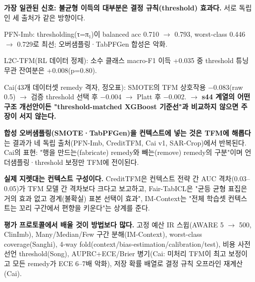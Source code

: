 \par\noindent \textbullet\enspace \textbf{가장 일관된 신호: 불균형 이득의 대부분은 결정 규칙(threshold) 효과다.} 서로 독립인 세 출처가 같은 방향이다.

\par\noindent \textbullet\enspace PFN-Imb: thresholding(τ=\allowbreak{}π₁)이 balanced acc 0.710 \ensuremath{\rightarrow} 0.793, worst-class 0.446 \ensuremath{\rightarrow} 0.729로 최선; 오버샘플링·TabPFGen 합성은 악화.


\par\noindent \textbullet\enspace L2C-TFM(RL 데이터 정제): 소수 클래스 macro-F1 이득 +\allowbreak{}0.035 중 threshold 튜닝 무관 잔여분은 +\allowbreak{}0.008(p=\allowbreak{}0.80).


\par\noindent \textbullet\enspace Cai(43개 데이터셋 remedy 격자, 정오표): SMOTE의 TFM 상호작용 −0.083(raw 0.5)  \ensuremath{\rightarrow}  검증 threshold 선택 후 −0.004  \ensuremath{\rightarrow}  Platt 후 −0.002.  \ensuremath{\rightarrow}  \textbf{s44 계열의 어떤 구조 개선안이든 "threshold-matched XGBoost 기준선"과 비교하지 않으면 주장이 서지 않는다.}



\par\noindent \textbullet\enspace \textbf{합성 오버샘플링(SMOTE·TabPFGen)을 컨텍스트에 넣는 것은 TFM에 해롭다}는 결과가 네 독립 출처(PFN-Imb, CreditTFM, Cai v1, SAR-Crop)에서 반복된다. Cai의 표현: "행을 만드는(fabricate) remedy와 빼는(remove) remedy의 구분"이며 언더샘플링·threshold 보정만 TFM에 전이된다.


\par\noindent \textbullet\enspace \textbf{실제 지렛대는 컨텍스트 구성이다.} CreditTFM은 컨텍스트 전략 간 AUC 격차(0.03–0.05)가 TFM 모델 간 격차보다 크다고 보고하고, Fair-TabICL은 "균등 균형 표집은 거의 효과 없고 경계(불확실) 표본 선택이 효과", IM-Context는 "전체 학습셋 컨텍스트는 꼬리 구간에서 편향을 키운다"는 상계를 준다.


\par\noindent \textbullet\enspace \textbf{평가 프로토콜에서 배울 것이 방법보다 많다.} 고정 예산 IR 스윕(AWARE 5 \ensuremath{\rightarrow} 500, ClinImb), Many/\allowbreak{}Median/\allowbreak{}Few 구간 분해(IM-Context), worst-class coverage(Sanghi), 4-way fold(context/\allowbreak{}bias-estimation/\allowbreak{}calibration/\allowbreak{}test), 비용 사전 선언 threshold(Song), AUPRC+\allowbreak{}ECE/\allowbreak{}Brier 병기(Cai: 미처리 TFM이 최고 보정이고 모든 remedy가 ECE 6–7배 악화), 저장 확률 배열로 결정 규칙 오프라인 재계산(Cai).



